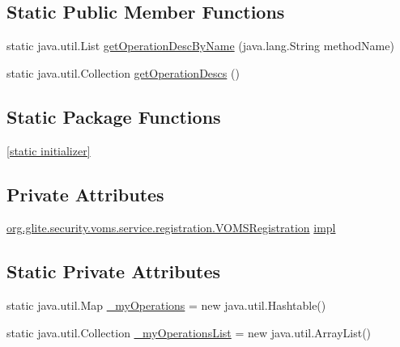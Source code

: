 \subsection*{Static Public Member Functions}
\begin{DoxyCompactItemize}
\item 
static java.util.List \hyperlink{classorg_1_1glite_1_1security_1_1voms_1_1service_1_1registration_1_1VOMSRegistrationSoapBindingSkeleton_aff141a894a07accceccc405115587d24}{getOperationDescByName} (java.lang.String methodName)
\item 
static java.util.Collection \hyperlink{classorg_1_1glite_1_1security_1_1voms_1_1service_1_1registration_1_1VOMSRegistrationSoapBindingSkeleton_acfac59969c12c4dca3c41e2ad3f37af0}{getOperationDescs} ()
\end{DoxyCompactItemize}
\subsection*{Static Package Functions}
\begin{DoxyCompactItemize}
\item 
\hyperlink{classorg_1_1glite_1_1security_1_1voms_1_1service_1_1registration_1_1VOMSRegistrationSoapBindingSkeleton_a03154cc5d3d0cee45026045b3953c27f}{\mbox{[}static initializer\mbox{]}}
\end{DoxyCompactItemize}
\subsection*{Private Attributes}
\begin{DoxyCompactItemize}
\item 
\hyperlink{interfaceorg_1_1glite_1_1security_1_1voms_1_1service_1_1registration_1_1VOMSRegistration}{org.glite.security.voms.service.registration.VOMSRegistration} \hyperlink{classorg_1_1glite_1_1security_1_1voms_1_1service_1_1registration_1_1VOMSRegistrationSoapBindingSkeleton_ade0732e7f9b175d03d807702a62fa79b}{impl}
\end{DoxyCompactItemize}
\subsection*{Static Private Attributes}
\begin{DoxyCompactItemize}
\item 
static java.util.Map \hyperlink{classorg_1_1glite_1_1security_1_1voms_1_1service_1_1registration_1_1VOMSRegistrationSoapBindingSkeleton_aa295c1e9707c7c93e37c1201b060e05f}{\_\-myOperations} = new java.util.Hashtable()
\item 
static java.util.Collection \hyperlink{classorg_1_1glite_1_1security_1_1voms_1_1service_1_1registration_1_1VOMSRegistrationSoapBindingSkeleton_add77f4ac2e5f9e1986b4205266a634d1}{\_\-myOperationsList} = new java.util.ArrayList()
\end{DoxyCompactItemize}


